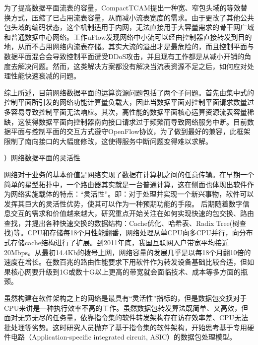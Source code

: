 为了提高数据平面流表的容量，CompactTCAM\cite{kannan2013compact}提出一种宽、窄包头域的等效替换方式，压缩了已占用流表容量，从而减小流表宽度的需求。由于更改了其他公共包头域的编码状态，这个机制适用于内网，无法直接用于大容量需求的骨干网广域和普通数据中心网络。工作uFlow\cite{zhengpeng2018uflow}发现网络中小流可以经由控制器直接转发到目的地，从而不占用网络内流表存储。其实大流的溢出才是最危险的，而且控制平面与数据平面混合会导致控制平面遭受DDoS攻击，并且现有工作都是从减小开销的角度去解决问题。然而，这类解决方案都没有解决当流表资源不足之后，如何应对处理性能快速衰减的问题。

综上所述，目前网络数据平面的运算资源问题包括了两个子问题。首先由集中式的控制平面所引发的网络功能计算量负载大，因此当数据平面对控制平面请求数量过多容易导致控制平面无法响应。其次，高性能的数据平面核心运算资源流表容量稀缺，这使得数据平面向控制器南向接口请求过于频繁而导致网络服务中断。目前数据平面与控制平面的交互方式遵守OpenFlow协议，为了做到最好的兼容，此框架限制了南向接口的大幅度修改，这使得服务中断问题变得难以求解。



\label{chap122}

{）网络数据平面的灵活性}


网络对于业务的基本价值是网络实现了数据在计算机之间的任意传输。在早期一个简单的星型拓扑中，一个路由器其实就是一台普通计算，这在侧面也体现出软件作为网络实施载体的特点：“灵活性”。即：对于处理并实现一个新兴事物，软件可以发挥其巨大的灵活性优势，使其可以作为一种预期功能的手段。
后期随着数字信息交互的需求和价值越来越大，研究重点开始关注在如何实现快速的包交换、路由查找，并提出各种快速交换的数据结构：Cache优化、哈希表、Radix Tree(树查找)等。CPU和存储每18个月性能翻番，网络处理从单CPU向多CPU并行，向分布式存储cache结构进行了扩展。到2011年底，我国互联网入户带宽平均接近20Mbps。从最初14.4Kb的拨号上网，网络容量的发展几乎是以每18个月翻10倍的速度在增长。在数百兆的路由性能要求下用软件作为转发设备基础比较合适，但如果核心网要升级到1G或数十G以上更高的带宽就会面临技术、成本等多方面的瓶颈。






虽然构建在软件架构之上的网络是最具有“灵活性”指标的，但是数据包交换对于CPU来讲是一种执行效率不高的工作。虽然数据包转发算法既简单、又高效，但面对无穷无尽的任务量，依靠指令集的软件转发架构存在访存效率差、CPU无法批处理等劣势。这时研究人员抛弃了基于指令集的软件架构，开始思考基于专用硬件电路（Application-specific integrated circuit, ASIC）的数据包处理模型。

